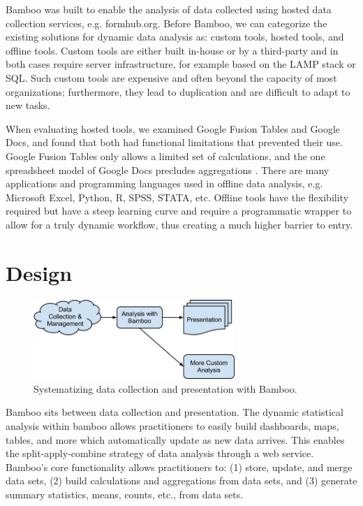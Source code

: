 \documentclass{acm_proc_article-sp}
\begin{document}
Bamboo was built to enable the analysis of data collected using hosted data collection services, e.g. formhub.org.  Before Bamboo, we can categorize the existing solutions for dynamic data analysis as: custom tools, hosted tools, and offline tools.  Custom tools are either built in-house or by a third-party and in both cases require server infrastructure, for example based on the LAMP stack or SQL.  Such custom tools are expensive and often beyond the capacity of most organizations; furthermore, they lead to duplication and are difficult to adapt to new tasks.

When evaluating hosted tools, we examined Google Fusion Tables and Google Docs, and found that both had functional limitations that prevented their use.  Google Fusion Tables only allows a limited set of calculations, and the one spreadsheet model of Google Docs precludes aggregations \cite{gonzalez1, gonzalez2}.  There are many applications and programming languages used in offline data analysis, e.g. Microsoft Excel, Python, R, SPSS, STATA, etc.  Offline tools have the flexibility required but have a steep learning curve and require a programmatic wrapper to allow for a truly dynamic workflow, thus creating a much higher barrier to entry.

\section{Design}

\begin{figure}
\centering
\includegraphics[width=3in]{figures/bamboo_flow}
\caption{Systematizing data collection and presentation with Bamboo.}
\label{fig:flow}
\end{figure}

Bamboo sits between data collection and presentation. The dynamic statistical analysis within bamboo allows practitioners to easily build dashboards, maps, tables, and more which automatically update as new data arrives.  This enables the split-apply-combine strategy of data analysis \cite{wickham} through a web service.  Bamboo’s core functionality allows practitioners to: (1) store, update, and merge data sets, (2) build calculations and aggregations from data sets, and (3) generate summary statistics, means, counts, etc., from data sets.
\end{document}

